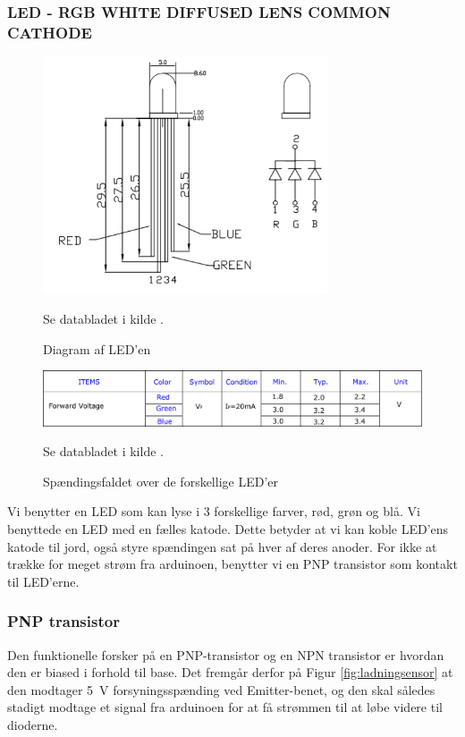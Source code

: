 \subsubsection{LED - RGB WHITE DIFFUSED LENS COMMON CATHODE}
\begin{figure}[H]
	\centering
    \includegraphics[height=7cm]{figures/komponenter/LED2}
	\caption{Diagram af LED'en}
	Se databladet i kilde \cite{kompRGBLED}.
\end{figure}
\begin{figure}[H]
	\centering
    \includegraphics[width=\textwidth]{figures/komponenter/LED}
	\caption{Spændingsfaldet over de forskellige LED'er}
	Se databladet i kilde \cite{kompRGBLED}.
\end{figure}
Vi benytter en LED som kan lyse i 3 forskellige farver, rød, grøn og blå. Vi benyttede en LED med en fælles katode. Dette betyder at vi kan koble LED'ens katode til jord, også styre spændingen sat på hver af deres anoder. For ikke at trække for meget strøm fra arduinoen, benytter vi en PNP transistor som kontakt til LED'erne.

\subsubsection{PNP transistor}
Den funktionelle forsker på en PNP-transistor og en NPN transistor er hvordan den er biased i forhold til base. Det fremgår derfor på Figur \ref{fig:ladningsensor} at den modtager \SI{5}{V} forsyningsspænding ved Emitter-benet, og den skal således stadigt modtage et signal fra arduinoen for at få strømmen til at løbe videre til dioderne.


